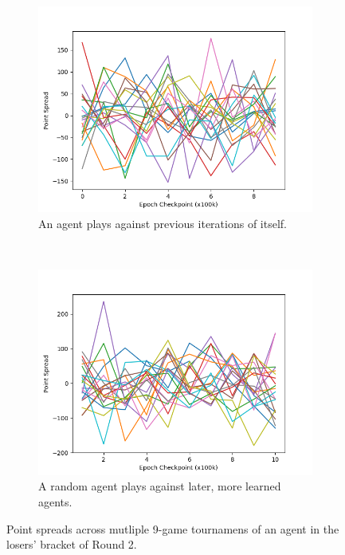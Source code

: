 
\begin{figure}
\center

\begin{subfigure}[b]{0.45\textwidth}
	\includegraphics[width=\linewidth]{images/findings/round2/spreads_self-v-prev_loser.png}
	\caption{An agent plays against previous iterations of itself.}
	\label{fig:r2-spreads-loser-a}
\end{subfigure}
~
\begin{subfigure}[b]{0.45\textwidth}
	\includegraphics[width=\linewidth]{images/findings/round2/spreads_rand-v-fut_loser.png}
	\caption{A random agent plays against later, more learned agents.}
	\label{fig:r2-spreads-loser-b}
\end{subfigure}

\caption{
	Point spreads across mutliple 9-game tournamens of an agent in the
	losers' bracket of Round 2.
}
\label{fig:r2-spreads-loser}
\end{figure}
